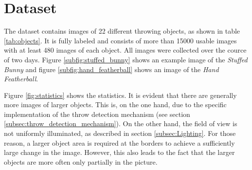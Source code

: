 \section{Dataset}
\label{sec:dataset}



The dataset contains images of 22 different throwing objects, as shown in table \ref{tab:objects}.
It is fully labeled and consists of more than \num{15000} usable images with at least 480 images of each object.
All images were collected over the cource of two days.
Figure \ref{subfig:stuffed_bunny} shows an example image of the \textit{Stuffed Bunny} and figure \ref{subfig:hand_featherball} shows an image of the \textit{Hand Featherball}.

Figure \ref{fig:statistics} shows the statistics.
It is evident that there are generally more images of larger objects.
This is, on the one hand, due to the specific implementation of the throw detection mechanism (see section \ref{subsec:throw_detection_mechanism}).
On the other hand, the field of view is not uniformly illuminated, as described in section \ref{subsec:Lighting}.
For those reason, a larger object area is required at the borders to achieve a sufficiently large change in the image.
However, this also leads to the fact that the larger objects are more often only partially in the picture.

